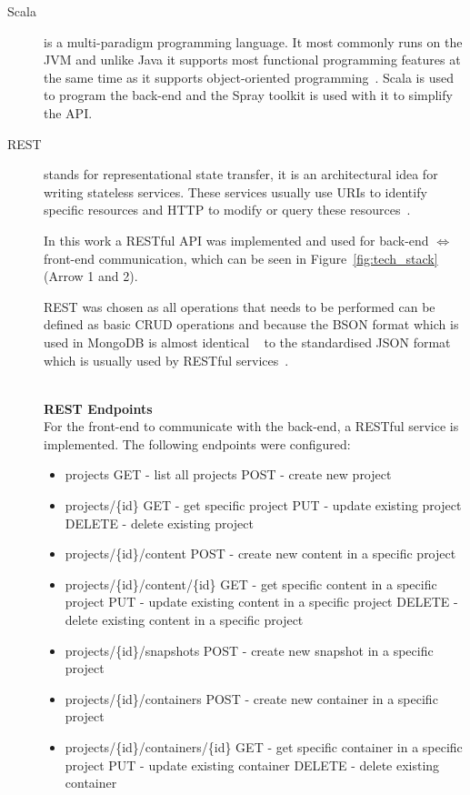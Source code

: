 \documentclass[a4paper,12pt]{article}
\newcommand{\Iff}{\Leftrightarrow}
\begin{document}
\begin{description}
\item[Scala]
is a multi-paradigm programming language. It most commonly runs on the JVM and unlike Java it
supports most functional programming features at the same time as it supports object-oriented
programming~\cite{SCALA}. Scala is used to program the back-end and the Spray toolkit is used with
it to simplify the API.

\item[REST]
stands for representational state transfer, it is an architectural idea for writing stateless
services. These services usually use URIs to identify specific resources and HTTP to modify or query
these resources~\cite{REST}. 

In this work a RESTful API was implemented and used for back-end $\Iff$ front-end
communication, which can be seen in Figure~\ref{fig:tech_stack} (Arrow 1 and 2).

REST was chosen as all operations that needs to be performed can be defined as basic CRUD operations
and because the BSON format which is used in MongoDB is almost identical ~\cite{BSON} to the
standardised JSON format which is usually used by RESTful services~\cite{JSON}. 

\hfill \\
\textbf{REST Endpoints} \hfill \\
For the front-end to communicate with the back-end, a RESTful service is implemented.
The following endpoints were configured:

\begin{itemize}
  \item projects
      \subitem GET - list all projects
      \subitem POST - create new project
  \item projects/\{id\}
      \subitem GET - get specific project
      \subitem PUT - update existing project
      \subitem DELETE - delete existing project
  \item projects/\{id\}/content
      \subitem POST - create new content in a specific project 
  \item projects/\{id\}/content/\{id\}
      \subitem GET - get specific content in a specific project
      \subitem PUT - update existing content in a specific project
      \subitem DELETE - delete existing content in a specific project

  \item projects/\{id\}/snapshots
      \subitem POST - create new snapshot in a specific project 

  \item projects/\{id\}/containers
      \subitem POST - create new container in a specific project 
  \item projects/\{id\}/containers/\{id\}
      \subitem GET - get specific container in a specific project
      \subitem PUT - update existing container
      \subitem DELETE - delete existing container
\end{itemize}


\end{description}
\end{document}
